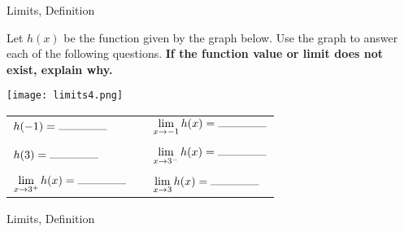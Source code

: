 
\begin{tagblock}{Limits, Definition}
\begin{question}
	
  \setcounter{enumi}{1}
Let $h(x)$ be the function given by the graph below. Use the graph to answer each of the following questions.  \textbf{If the function value or limit does not exist, explain why.}

\begin{minipage}{.4\textwidth}
\texttt{[image: limits4.png]}\end{minipage}%
\begin{minipage}{.6\textwidth}
\begin{tabular}{lll}
 $h(-1) =  \rule{1.5cm}{.1mm}$ &\hspace{.2in} & $\displaystyle \lim_{x \to -1} h(x) =  \rule{1.5cm}{.1mm}$ \\ \\
 $h(3) =  \rule{1.5cm}{.1mm}$ &\hspace{.2in}&  $\displaystyle \lim_{x \to 3^-} h(x) =  \rule{1.5cm}{.1mm}$ \\ \\
  $\displaystyle \lim_{x \to 3^+} h(x) =  \rule{1.5cm}{.1mm}$ & \hspace{.2in} &$\displaystyle \lim_{x \to 3} h(x) =  \rule{1.5cm}{.1mm}$ \\
  \end{tabular}
\end{minipage}	
	
\begin{tags}
	    Limits, Definition
\end{tags}
	
\begin{diary}
	    
\end{diary}
	
\begin{solution}
	  
\end{solution}
	
\end{question}

\end{tagblock}

